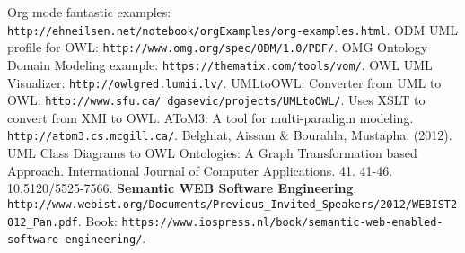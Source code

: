 \documentclass[conference,a4paper]{IEEEtran}
\providecommand\url[1]{\texttt{#1}}
\begin{document}
\begin{thebibliography}{11}
 Org mode fantastic examples: \url{http://ehneilsen.net/notebook/orgExamples/org-examples.html}.
 ODM UML profile for OWL: \url{http://www.omg.org/spec/ODM/1.0/PDF/}.
 OMG Ontology Domain Modeling example: \url{https://thematix.com/tools/vom/}.
 OWL UML Visualizer: \url{http://owlgred.lumii.lv/}.
 UMLtoOWL: Converter from UML to OWL: \url{http://www.sfu.ca/~dgasevic/projects/UMLtoOWL/}. Uses XSLT to convert from XMI to OWL.
 AToM3: A tool for multi-paradigm modeling. \url{http://atom3.cs.mcgill.ca/}.
 Belghiat, Aissam \& Bourahla, Mustapha. (2012). UML Class Diagrams to OWL Ontologies: A Graph Transformation based Approach. International Journal of Computer Applications. 41. 41-46. 10.5120/5525-7566.
 \textbf{Semantic WEB Software Engineering}: \url{http://www.webist.org/Documents/Previous\_Invited\_Speakers/2012/WEBIST2012\_Pan.pdf}. Book: \url{https://www.iospress.nl/book/semantic-web-enabled-software-engineering/}.
\end{thebibliography}




\end{document}
